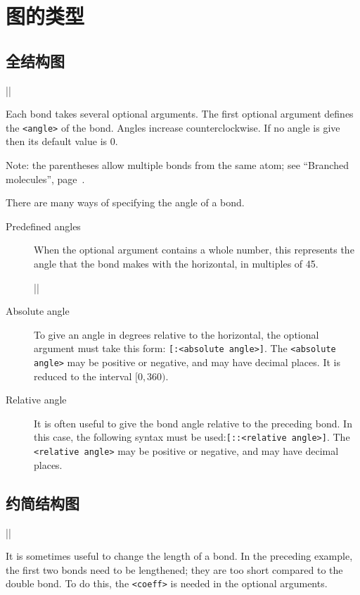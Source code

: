 \documentclass[10pt]{article}
\begin{document}
\section{图的类型}
\subsection{全结构图}
||

Each bond takes several optional arguments. The first optional argument defines the \verb-<angle>- of the bond. Angles increase counterclockwise. If no angle is give then its default value is 0\degres.

Note: the parentheses allow multiple bonds from the same atom; see ``Branched molecules'', page~\pageref{molecules.ramifiees}.

There are many ways of specifying the angle of a bond.
\begin{description}
\item[Predefined angles] When the optional argument contains a whole number, this represents the angle that the bond makes with the horizontal, in multiples of 45\degres.

||

\item[Absolute angle] To give an angle in degrees relative to the horizontal, the optional argument must take this form: \verb-[:<absolute angle>]-. The \verb-<absolute angle>- may be positive or negative, and may have decimal places. It is reduced to the interval $[0,360)$.
\item[Relative angle] It is often useful to give the bond angle relative to the preceding bond. In this case, the following syntax must be used:\verb-[::<relative angle>]-. The \verb-<relative angle>- may be positive or negative, and may have decimal places.
\end{description}

\subsection{约简结构图}
||

It is sometimes useful to change the length of a bond. In the preceding example, the first two bonds need to be lengthened; they are too short compared to the double bond. To do this, the \verb|<coeff>| is needed in the optional arguments.
\end{document}
